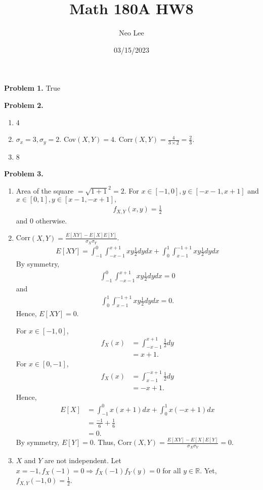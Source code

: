 \documentclass{article}
\title{Math 180A HW8}
\author{Neo Lee}
\date{03/15/2023}
\begin{document}
 

\maketitle 

\textbf{Problem 1.} True
\bigbreak

\textbf{Problem 2.}
\begin{enumerate}[label={(\alph*)}]
    \item 4
    \item $\sigma_x = 3, \sigma_y = 2$. Cov$(X,Y)=4$. Corr$(X,Y)=\frac{4}{3\times 2}=\frac{2}{3}$.
    \item 8
\end{enumerate}
\bigbreak

\textbf{Problem 3.}
\begin{enumerate}[label={(\alph*)}]
    \item 
    Area of the square $=\sqrt{1+1}^2=2.$ For $x\in[-1,0], y\in[-x-1,x+1]$ and $x\in[0,1],y\in[x-1,-x+1],$
    \begin{align}
        f_{X,Y}(x,y)=\frac{1}{2}
    \end{align}
    and 0 otherwise.

    \item 
    Corr$(X,Y)=\frac{E[XY]-E[X]E[Y]}{\sigma_X \sigma_Y}$.
    \begin{align}
        E[XY]=\int_{-1}^{0}\int_{-x-1}^{x+1}xy\frac{1}{2}dydx + \int_{0}^{1}\int_{x-1}^{-1+1}xy\frac{1}{2}dydx
    \end{align}
    By symmetry, 
    \begin{align}
        \int_{-1}^{0}\int_{-x-1}^{x+1}xy\frac{1}{2}dydx=0
    \end{align}
    and 
    \begin{align}
        \int_{0}^{1}\int_{x-1}^{-1+1}xy\frac{1}{2}dydx=0.
    \end{align}
    Hence, $E[XY]=0.$

    For $x\in[-1,0],$
    \begin{align}
        f_X(x)&=\int_{-x-1}^{x+1}\frac{1}{2}dy \\
        &= x+1.
    \end{align}
    For $x\in[0,-1],$
    \begin{align}
        f_X(x)&=\int_{x-1}^{-x+1}\frac{1}{2}dy \\
        &= -x+1.
    \end{align}
    Hence,
    \begin{align}
        E[X]&=\int_{-1}^{0}x(x+1)dx + \int_{0}^{1}x(-x+1)dx \\
        &=\frac{-1}{6}+\frac{1}{6} \\
        &=0.
    \end{align}
    By symmetry, $E[Y]=0.$ Thus, Corr$(X,Y)=\frac{E[XY]-E[X]E[Y]}{\sigma_X \sigma_Y}=0.$

    \item 
    $X$ and $Y$ are not independent. Let $x=-1,f_X(-1)=0\Rightarrow f_X(-1)f_Y(y)=0$ for all $y\in\mathbb{R}$. Yet, $f_{X,Y}(-1,0)=\frac{1}{2}$.
\end{enumerate}
\bigbreak
\end{document}
